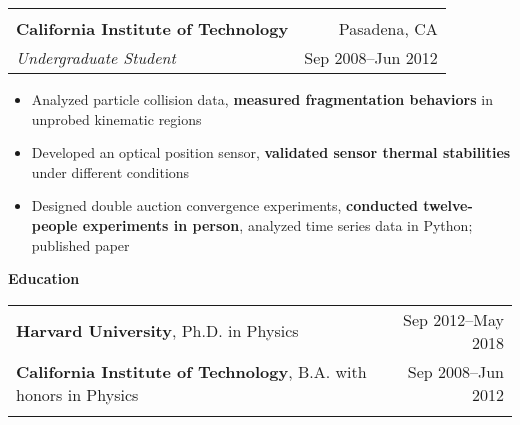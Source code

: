 \documentclass[letterpaper,11pt,oneside]{article}
\begin{document}
 \begin{flushleft}
 \vspace{-0.45cm}
 \begin{tabular}{@{} l r@{} }
    \hspace{0.78\linewidth} & \hspace{0.1\linewidth} \\
    \textbf{California Institute of Technology} & Pasadena, CA \\ 
    \textit{Undergraduate Student} & Sep 2008--Jun 2012 \\ 
 \end{tabular}
 \end{flushleft}
 \begin{flushleft}
  \begin{small}
 \begin{itemize}[leftmargin=*]
 \item Analyzed particle collision data, \textbf{measured fragmentation behaviors} in unprobed kinematic regions
 \item Developed an optical position sensor, \textbf{validated sensor thermal stabilities} under different conditions
 \item Designed double auction convergence experiments, \textbf{conducted twelve-people experiments in person}, analyzed time series data in Python; published paper
 \end{itemize}
  \end{small}
 \end{flushleft}

 \vspace{0.1cm}
\raggedright
\normalsize
\begin{flushleft}
 \textbf{\Large{Education}} \sout{\hfill} \\
\vspace{0.5cm}
\begin{tabular}{@{} l r@{}}
     \textbf{Harvard University}, Ph.D. in Physics & Sep 2012--May 2018 \\
     \textbf{California Institute of Technology}, B.A. with honors in  Physics & Sep 2008--Jun 2012 \\
     \hspace{0.78\linewidth} & \hspace{0.1\linewidth} \\
\end{tabular}
\end{flushleft}




\clearpage
\end{document}
